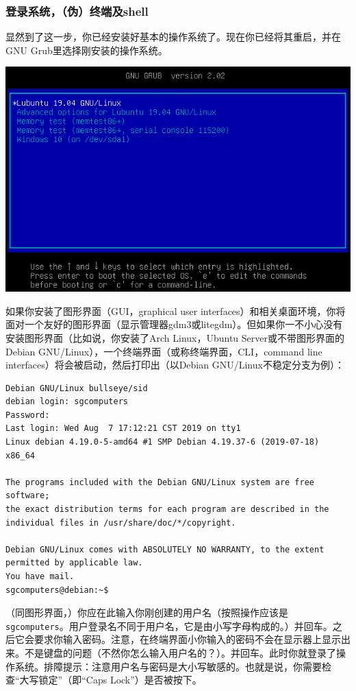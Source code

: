 \subsubsection{登录系统，（伪）终端及shell} 
\cite{intro1}\par
显然到了这一步，你已经安装好基本的操作系统了。现在你已经将其重启，并在GNU Grub里选择刚安装的操作系统。
\begin{center}
	\includegraphics[scale=0.6]{pic/lubstart}
\end{center} \par
如果你安装了图形界面（GUI，graphical user interfaces）和相关桌面环境，你将面对一个友好的图形界面（显示管理器gdm3或litegdm）。但如果你一不小心没有安装图形界面（比如说，你安装了Arch Linux，Ubuntu Server或不带图形界面的Debian GNU/Linux），一个终端界面（或称终端界面，CLI，command line interfaces）将会被启动，然后打印出（以Debian GNU/Linux不稳定分支为例）：
\begin{verbatim}
Debian GNU/Linux bullseye/sid
debian login: sgcomputers
Password:
Last login: Wed Aug  7 17:12:21 CST 2019 on tty1
Linux debian 4.19.0-5-amd64 #1 SMP Debian 4.19.37-6 (2019-07-18) x86_64

The programs included with the Debian GNU/Linux system are free software;
the exact distribution terms for each program are described in the
individual files in /usr/share/doc/*/copyright.

Debian GNU/Linux comes with ABSOLUTELY NO WARRANTY, to the extent
permitted by applicable law.
You have mail.
sgcomputers@debian:~$ 
\end{verbatim} \par
（同图形界面，）你应在此输入你刚创建的用户名（按照操作应该是\verb|sgcomputers|。用户登录名不同于用户名，它是由小写字母构成的。）并回车。之后它会要求你输入密码。注意，在终端界面小你输入的密码不会在显示器上显示出来。不是键盘的问题（不然你怎么输入用户名的？）。并回车。此时你就登录了操作系统。排障提示：注意用户名与密码是大小写敏感的。也就是说，你需要检查“大写锁定”（即“Caps Lock”）是否被按下。\par
